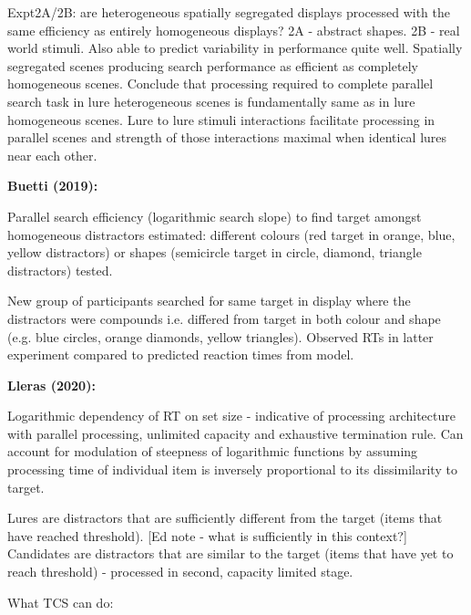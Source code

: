 Expt2A/2B: are heterogeneous spatially segregated displays processed with the same efficiency as entirely homogeneous displays? 2A - abstract shapes. 2B - real world stimuli. Also able to predict variability in performance quite well. Spatially segregated scenes producing search performance as efficient as completely homogeneous scenes.
Conclude that processing required to complete parallel search task in lure heterogeneous scenes is fundamentally same as in lure homogeneous scenes. Lure to lure stimuli interactions facilitate processing in parallel scenes and strength of those interactions maximal when identical lures near each other.


\textbf{Buetti (2019):} 

Parallel search efficiency (logarithmic search slope) to find target amongst homogeneous distractors estimated: different colours (red target in orange, blue, yellow distractors) or shapes (semicircle target in circle, diamond, triangle distractors) tested. 

New group of participants searched for same target in display where the distractors were compounds i.e. differed from target in both colour and shape (e.g. blue circles, orange diamonds, yellow triangles). Observed RTs in latter experiment compared to predicted reaction times from model. 

\textbf{Lleras (2020):}

Logarithmic dependency of RT on set size - indicative of processing architecture with parallel processing, unlimited capacity and exhaustive termination rule. Can account for modulation of steepness of logarithmic functions by assuming processing time of individual item is inversely proportional to its dissimilarity to target.

Lures are distractors that are sufficiently different from the target (items that have reached threshold). [Ed note - what is sufficiently in this context?] Candidates are distractors that are similar to the target (items that have yet to reach threshold) - processed in second, capacity limited stage. 

What TCS can do:

